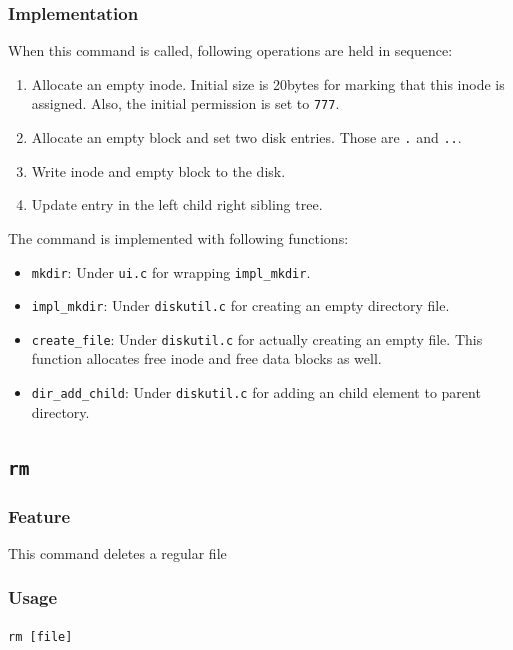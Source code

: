 \documentclass{homework}
\begin{document}
\subsubsection{Implementation}
When this command is called, following operations are held in sequence:
\begin{enumerate}
    \item Allocate an empty inode. Initial size is 20bytes for marking that this inode is assigned. Also, the initial permission is set to \texttt{777}.
    \item Allocate an empty block and set two disk entries. Those are \texttt{.} and \texttt{..}.
    \item Write inode and empty block to the disk.
    \item Update entry in the left child right sibling tree.
\end{enumerate}

The command is implemented with following functions:
\begin{itemize}
    \item \texttt{mkdir}: Under \texttt{ui.c} for wrapping \texttt{impl_mkdir}.
    \item \texttt{impl_mkdir}: Under \texttt{diskutil.c} for creating an empty directory file.
    \item \texttt{create_file}: Under \texttt{diskutil.c} for actually creating an empty file. This function allocates free inode and free data blocks as well.
    \item \texttt{dir_add_child}: Under \texttt{diskutil.c} for adding an child element to parent directory.
\end{itemize}


\subsection{\texttt{rm}}
\subsubsection{Feature}
This command deletes a regular file
\subsubsection{Usage}
\begin{center}
\texttt{rm [file]}
\end{center}
\end{document}

